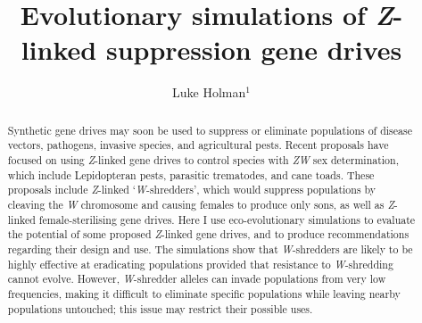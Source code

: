 \documentclass[]{rsos}%
\begin{document}
\title{Evolutionary simulations of \emph{Z}-linked suppression gene drives}

\author{
Luke Holman$^{1}$}

\address{
  $^{1}$School of BioSciences, The University of Melbourne, Victoria 3010,
Australia.}
\subject{
Evolutionary biology,
Theoretical modelling,
Gene drives}



\begin{abstract}
Synthetic gene drives may soon be used to suppress or eliminate
populations of disease vectors, pathogens, invasive species, and
agricultural pests. Recent proposals have focused on using
\emph{Z}-linked gene drives to control species with \emph{ZW} sex
determination, which include Lepidopteran pests, parasitic trematodes,
and cane toads. These proposals include \emph{Z}-linked
`\emph{W}-shredders', which would suppress populations by cleaving the
\emph{W} chromosome and causing females to produce only sons, as well as
\emph{Z}-linked female-sterilising gene drives. Here I use
eco-evolutionary simulations to evaluate the potential of some proposed
\emph{Z}-linked gene drives, and to produce recommendations regarding
their design and use. The simulations show that \emph{W}-shredders are
likely to be highly effective at eradicating populations provided that
resistance to \emph{W}-shredding cannot evolve. However,
\emph{W}-shredder alleles can invade populations from very low
frequencies, making it difficult to eliminate specific populations while
leaving nearby populations untouched; this issue may restrict their
possible uses.
\end{abstract}

\providecommand{\tightlist}{%
  \setlength{\itemsep}{0pt}\setlength{\parskip}{0pt}}
\providecommand{\EndFirstPage}{%
}

\maketitle
\end{document}
